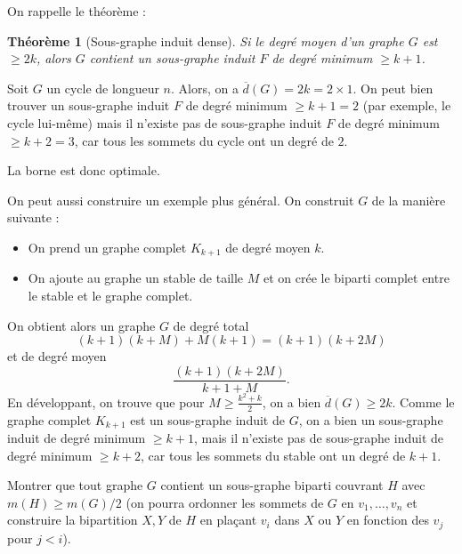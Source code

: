 \documentclass[11pt,a4paper]{article}
\newcommand{\ol}[1]{\overline{#1}}
\theoremstyle{break}
\newtheorem{theorem}{Théorème}
\begin{document}
\begin{td-sol}
    On rappelle le théorème :
    \begin{theorem}[Sous-graphe induit dense]
        Si le degré moyen d'un graphe \(G\) est \(\geq 2k\), alors \(G\) contient un sous-graphe induit \(F\) de degré minimum \(\geq k + 1\).
    \end{theorem}

    Soit \(G\) un cycle de longueur \(n\). Alors, on a \(\ol{d}(G) = 2k = 2 \times 1\).
    On peut bien trouver un sous-graphe induit \(F\) de degré minimum \(\geq k + 1 = 2\) (par exemple, le cycle lui-même) mais il n'existe pas de sous-graphe induit \(F\) de degré minimum \(\geq k + 2 = 3\), car tous les sommets du cycle ont un degré de \(2\).

    La borne est donc optimale.

    On peut aussi construire un exemple plus général. On construit \(G\) de la manière suivante :
    \begin{itemize}
        \item On prend un graphe complet \(K_{k + 1}\) de degré moyen \(k\).
        \item On ajoute au graphe un stable de taille \(M\) et on crée le biparti complet entre le stable et le graphe complet.
    \end{itemize}
    On obtient alors un graphe \(G\) de degré total
    \begin{equation*}
        (k+1)(k+M) + M(k+1) = (k+1)(k+2M)
    \end{equation*}
    et de degré moyen
    \begin{equation*}
        \frac{(k+1)(k+2M)}{k+1+M}.
    \end{equation*}
    En développant, on trouve que pour \(M \geq \frac{k^2 + k}{2}\), on a bien \(\ol{d}(G) \geq 2k\).
    Comme le graphe complet \(K_{k + 1}\) est un sous-graphe induit de \(G\), on a bien un sous-graphe induit de degré minimum \(\geq k + 1\), mais il n'existe pas de sous-graphe induit de degré minimum \(\geq k + 2\), car tous les sommets du stable ont un degré de \(k + 1\).
\end{td-sol}

\begin{td-exo}
    Montrer que tout graphe \(G\) contient un sous-graphe biparti couvrant \(H\) avec \(m(H) \geq m(G)/2\) (on pourra ordonner les sommets de \(G\) en \(v_1,\ldots,v_n\) et construire la bipartition \(X, Y\) de \(H\) en plaçant \(v_i\) dans \(X\) ou \(Y\) en fonction des \(v_j\) pour \(j < i\)).
\end{td-exo}
\end{document}
